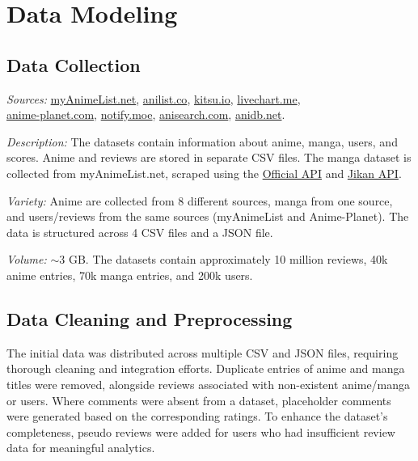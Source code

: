 \section{Data Modeling}

\subsection{Data Collection}

\textit{Sources:}
\href{https://myanimelist.net/}{myAnimeList.net}, 
\href{https://anilist.co/}{anilist.co},
\href{https://kitsu.io/}{kitsu.io},
\href{https://livechart.me/}{livechart.me}, \\
\href{https://anime-planet.com/}{anime-planet.com},
\href{https://notify.moe/}{notify.moe},
\href{https://anisearch.com/}{anisearch.com},
\href{https://anidb.net/}{anidb.net}.

\vspace{\baselineskip}

\textit{Description:} The datasets contain information about anime, manga, users, and scores. 
Anime and reviews are stored in separate CSV files. The manga dataset is collected from myAnimeList.net, 
scraped using the \href{https://myanimelist.net/apiconfig/references/api/v2}{Official API} and \href{https://docs.api.jikan.moe/}{Jikan API}.

\vspace{\baselineskip}

\textit{Variety:} Anime are collected from 8 different sources, manga from one source, 
and users/reviews from the same sources (myAnimeList and Anime-Planet). 
The data is structured across 4 CSV files and a JSON file.

\vspace{\baselineskip}

\textit{Volume:} $\sim$3 GB\@. The datasets contain approximately 10 million reviews, 40k anime entries, 70k manga entries, 
and 200k users.

\subsection{Data Cleaning and Preprocessing}

The initial data was distributed across multiple CSV and JSON files, requiring thorough cleaning and integration efforts.
Duplicate entries of anime and manga titles were removed, alongside reviews associated with non-existent anime/manga or 
users. Where comments were absent from a dataset, placeholder comments were generated based on the corresponding 
ratings. To enhance the dataset's completeness, pseudo reviews were added for users who had insufficient review data for meaningful analytics.

